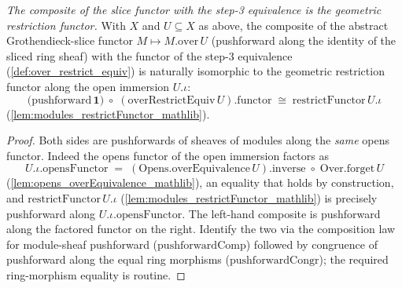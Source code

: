 \begin{lemma}

  \label{lem:over_restrict_functor_iso}
  \textit{The composite of the slice functor with the step-3 equivalence is the geometric restriction
  functor.}
  With \(X\) and \(U \subseteq X\) as above, the composite of the abstract Grothendieck-slice functor
  \(M \mapsto M.\mathrm{over}\,U\) (pushforward along the identity of the sliced ring sheaf) with the
  functor of the step-3 equivalence (\cref{def:over_restrict_equiv}) is naturally isomorphic to the
  geometric restriction functor along the open immersion \(U.\iota\):
  \[
    \bigl(\mathrm{pushforward}\,\mathbf{1}\bigr) \;\circ\; (\mathrm{overRestrictEquiv}\,U).\mathrm{functor}
      \;\cong\; \mathrm{restrictFunctor}\,U.\iota
  \]
  (\cref{lem:modules_restrictFunctor_mathlib}).
\end{lemma}
\begin{proof}
  Both sides are pushforwards of sheaves of modules along the \emph{same} opens functor. Indeed the
  opens functor of the open immersion factors as
  \[
    U.\iota.\mathrm{opensFunctor}
      \;=\; (\mathrm{Opens.overEquivalence}\,U).\mathrm{inverse}\;\circ\;\mathrm{Over.forget}\,U
  \]
  (\cref{lem:opens_overEquivalence_mathlib}), an equality that holds by construction, and
  \(\mathrm{restrictFunctor}\,U.\iota\) (\cref{lem:modules_restrictFunctor_mathlib}) is precisely
  pushforward along \(U.\iota.\mathrm{opensFunctor}\). The left-hand composite is pushforward along the
  factored functor on the right. Identify the two via the composition law for module-sheaf
  pushforward (\(\mathrm{pushforwardComp}\)) followed by congruence of pushforward along the equal ring
  morphisms (\(\mathrm{pushforwardCongr}\)); the required ring-morphism equality is routine.
\end{proof}


